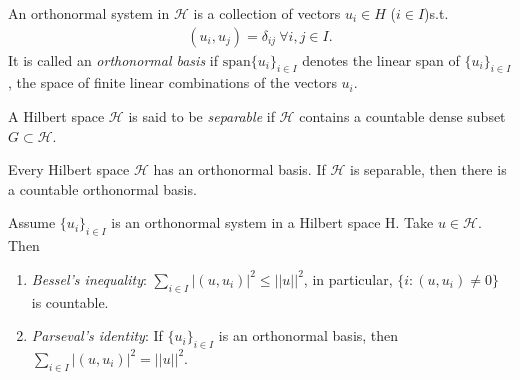 \begin{definition}
    An orthonormal system in \(\mathcal{H}\) is a collection of vectors \(u_i\in H \) (\(i\in I\))s.t.
    \begin{align*}
        (u_i,u_j) = \delta_{ij} \ \forall i,j\in I.
    \end{align*}
    It is called an \emph{orthonormal basis} if \(\text{span}\{u_i\}_{i\in I}\) denotes the linear span of \(\{u_i\}_{i\in I}\), the space of finite
    linear combinations of the vectors \(u_i\).
\end{definition}
\begin{definition}
    A Hilbert space \(\mathcal{H}\) is said to be \emph{separable} if \(\mathcal{H}\) contains a countable dense subset 
    \(G\subset\mathcal{H}\).
\end{definition}
\begin{theorem}
    Every Hilbert space \(\mathcal{H}\) has an orthonormal basis. If \(\mathcal{H}\) is separable, then there is a countable orthonormal basis.
\end{theorem}
\begin{proposition}
    Assume \(\{u_i\}_{i\in I}\) is an orthonormal system in a Hilbert space H. Take \(u\in\mathcal{H}\). Then 
    \begin{enumerate}[label=(\roman*)]
        \item \emph{Bessel's inequality}: \(\sum_{i\in I} |(u,u_i)|^2\leq ||u||^2\), in particular, \(\{i:(u,u_i)\neq 0\}\) is countable.
        \item \emph{Parseval's identity}: If \(\{u_i\}_{i\in I }\) is an orthonormal basis, then \\ \(\sum_{i\in I} |(u,u_i)|^2 = ||u||^2\).
    \end{enumerate}
\end{proposition}

